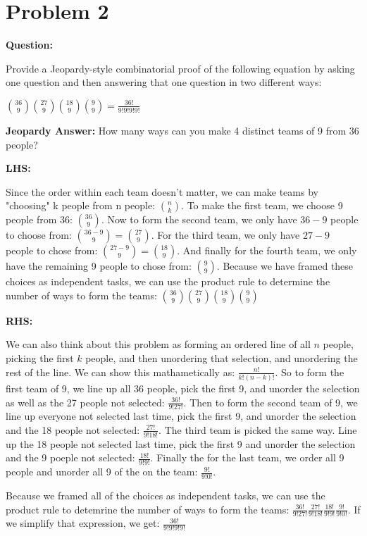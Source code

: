 \documentclass[11pt]{article}
\begin{document}
\section*{Problem 2}

\textbf{Question: }

Provide a Jeopardy-style combinatorial proof of the following equation by asking one question and then answering that one question in two different ways:

$\binom{36}{9} \binom{27}{9} \binom{18}{9} \binom{9}{9} = \frac{36!}{9!9!9!9!}$

\textbf{Jeopardy Answer:}
How many ways can you make 4 distinct teams of 9 from 36 people?

\textbf{LHS:}

Since the order within each team doesn't matter, we can make teams by "choosing" k people from n people: $\binom{n}{k}$. To make the first team, we choose 9 people from 36: $\binom{36}{9}$. Now to form the second team, we only have $36-9$ people to choose from: $\binom{36-9}{9} = \binom{27}{9}$. For the third team, we only have $27 - 9$ people to chose from: $\binom{27-9}{9}=\binom{18}{9}$. And finally for the fourth team, we only have the remaining 9 people to chose from: $\binom{9}{9}$. Because we have framed these choices as independent tasks, we can use the product rule to determine the number of ways to form the teams: $\binom{36}{9} \binom{27}{9} \binom{18}{9} \binom{9}{9}$

\textbf{RHS:}

We can also think about this problem as forming an ordered line of all $n$ people, picking the first $k$ people, and then unordering that selection, and unordering the rest of the line. We can show this mathametically as: $\frac{n!}{k!(n-k)!}$. So to form the first team of 9, we line up all 36 people, pick the first 9, and unorder the selection as well as the 27 people not selected: $\frac{36!}{9!27!}$. Then to form the second team of 9, we line up everyone not selected last time, pick the first 9, and unorder the selection and the 18 people not selected: $\frac{27!}{9!18!}$. The third team is picked the same way. Line up the 18 people not selected last time, pick the first 9 and unorder the selection and the 9 poeple not selected: $\frac{18!}{9!9!}$. Finally the for the last team, we order all 9 people and unorder all 9 of the on the team: $\frac{9!}{9!0!}$.

Because we framed all of the choices as independent tasks, we can use the product rule to detemrine the number of ways to form the teams: $\frac{36!}{9!27!} \frac{27!}{9!18!} \frac{18!}{9!9!} \frac{9!}{9!0!}$. If we simplify that expression, we get: $\frac{36!}{9!9!9!9!}$
\end{document}
